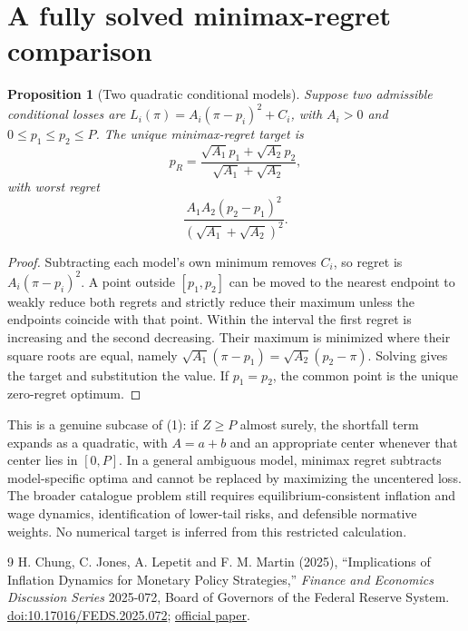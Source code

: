 \documentclass[11pt,a4paper]{article}
\newtheorem{proposition}[theorem]{Proposition}
\theoremstyle{remark}
\begin{document}
\section{A fully solved minimax-regret comparison}
\begin{proposition}[Two quadratic conditional models]
Suppose two admissible conditional losses are
$L_i(\pi)=A_i(\pi-p_i)^2+C_i$, with $A_i>0$ and $0\le p_1\le p_2\le P$. The unique minimax-regret target is
\[
 p_R=\frac{\sqrt{A_1}p_1+\sqrt{A_2}p_2}{\sqrt{A_1}+\sqrt{A_2}},
\]
with worst regret
\[
 \frac{A_1A_2(p_2-p_1)^2}{(\sqrt{A_1}+\sqrt{A_2})^2}.
\]
\end{proposition}
\begin{proof}
Subtracting each model's own minimum removes $C_i$, so regret is $A_i(\pi-p_i)^2$. A point outside $[p_1,p_2]$ can be moved to the nearest endpoint to weakly reduce both regrets and strictly reduce their maximum unless the endpoints coincide with that point. Within the interval the first regret is increasing and the second decreasing. Their maximum is minimized where their square roots are equal, namely $\sqrt{A_1}(\pi-p_1)=\sqrt{A_2}(p_2-\pi)$. Solving gives the target and substitution the value. If $p_1=p_2$, the common point is the unique zero-regret optimum.
\end{proof}
This is a genuine subcase of (1): if $Z\ge P$ almost surely, the shortfall term expands as a quadratic, with $A=a+b$ and an appropriate center whenever that center lies in $[0,P]$. In a general ambiguous model, minimax regret subtracts model-specific optima and cannot be replaced by maximizing the uncentered loss. The broader catalogue problem still requires equilibrium-consistent inflation and wage dynamics, identification of lower-tail risks, and defensible normative weights. No numerical target is inferred from this restricted calculation.

\begin{thebibliography}{9}
 H. Chung, C. Jones, A. Lepetit and F. M. Martin (2025), ``Implications of Inflation Dynamics for Monetary Policy Strategies,'' \emph{Finance and Economics Discussion Series} 2025-072, Board of Governors of the Federal Reserve System. \href{https://doi.org/10.17016/FEDS.2025.072}{doi:10.17016/FEDS.2025.072}; \href{https://www.federalreserve.gov/econres/feds/files/2025072pap.pdf}{official paper}.
\end{thebibliography}
\end{document}
